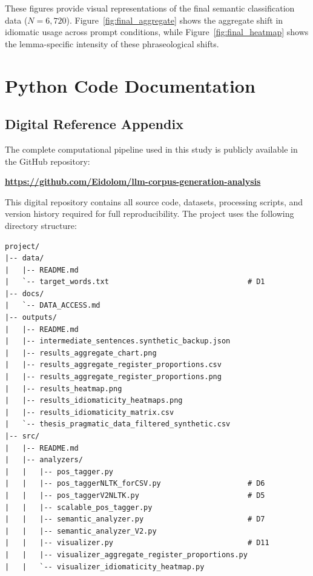 \documentclass[11pt,a4paper]{article}
\begin{document}
These figures provide visual representations of the final semantic classification data ($N=6,720$). Figure~\ref{fig:final_aggregate} shows the aggregate shift in idiomatic usage across prompt conditions, while Figure~\ref{fig:final_heatmap} shows the lemma-specific intensity of these phraseological shifts.

\clearpage
\section{Python Code Documentation} \label{app:python}

\subsection*{Digital Reference Appendix}

The complete computational pipeline used in this study is publicly available in the GitHub repository:

\begin{center}
\textbf{\url{https://github.com/Eidolom/llm-corpus-generation-analysis}}
\end{center}

\noindent This digital repository contains all source code, datasets, processing scripts, and version history required for full reproducibility. The project uses the following directory structure:

\vspace{0.5em}

\begin{center}
\begin{minipage}{0.8\textwidth}
\small
\begin{verbatim}
project/
|-- data/
|   |-- README.md
|   `-- target_words.txt                                # D1
|-- docs/
|   `-- DATA_ACCESS.md
|-- outputs/
|   |-- README.md
|   |-- intermediate_sentences.synthetic_backup.json
|   |-- results_aggregate_chart.png
|   |-- results_aggregate_register_proportions.csv
|   |-- results_aggregate_register_proportions.png
|   |-- results_heatmap.png
|   |-- results_idiomaticity_heatmaps.png
|   |-- results_idiomaticity_matrix.csv
|   `-- thesis_pragmatic_data_filtered_synthetic.csv
|-- src/
|   |-- README.md
|   |-- analyzers/
|   |   |-- pos_tagger.py
|   |   |-- pos_taggerNLTK_forCSV.py                    # D6
|   |   |-- pos_taggerV2NLTK.py                         # D5
|   |   |-- scalable_pos_tagger.py
|   |   |-- semantic_analyzer.py                        # D7
|   |   |-- semantic_analyzer_V2.py
|   |   |-- visualizer.py                               # D11
|   |   |-- visualizer_aggregate_register_proportions.py
|   |   `-- visualizer_idiomaticity_heatmap.py
\end{verbatim}
\end{minipage}
\vspace*{\fill}
\label{fig:repo-layout-part1}
\end{center}
\end{document}
